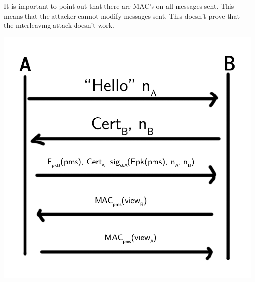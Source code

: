             \begin{frame}
                It is important to point out that there are MAC's on all messages sent. This means that the attacker cannot modify messages sent. This doesn't prove that the interleaving attack doesn't work. 
            \end{frame}
            \begin{frame}
                \includegraphics[width=\textwidth]{content/ssl.pdf}
            \end{frame}

